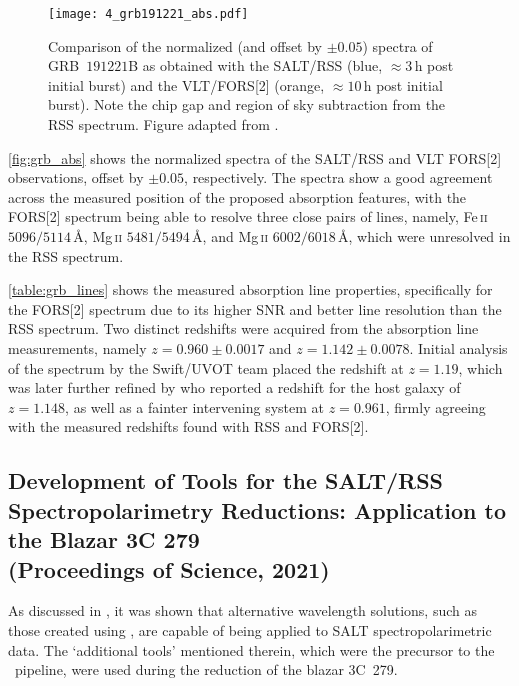 \begin{figure}[t]
    \centering
    \texttt{[image: 4\_grb191221\_abs.pdf]}
    \caption{
        Comparison of the normalized (and offset by $\pm 0.05$) spectra of GRB~$191221$B as obtained with the \gls{SALT}/\gls{RSS} (blue, $\approx 3$\,h post initial burst) and the \gls{VLT}/\gls{FORS}[2] (orange, $\approx 10$\,h post initial burst).
        Note the chip gap and region of sky subtraction from the \gls{RSS} spectrum.
        Figure adapted from \citep{Buckley191221B}.
    }
    \label{fig:grb_abs}
\end{figure}

\autoref{fig:grb_abs} shows the normalized spectra of the \gls{SALT}/\gls{RSS} and \gls{VLT} \gls{FORS}[2] observations, offset by $\pm 0.05$, respectively.
The spectra show a good agreement across the measured position of the proposed absorption features, with the \gls{FORS}[2] spectrum being able to resolve three close pairs of lines, namely, {Fe}\,\textsc{ii} $5096/5114$\,\AA, {Mg}\,\textsc{ii} $5481/5494$\,\AA, and {Mg}\,\textsc{ii} $6002/6018$\,\AA, which were unresolved in the \gls{RSS} spectrum.



\pagebreak

\autoref{table:grb_lines} shows the measured absorption line properties, specifically for the \gls{FORS}[2] spectrum due to its higher \gls{SNR} and better line resolution than the \gls{RSS} spectrum.
Two distinct redshifts were acquired from the absorption line measurements, namely $z = 0.960 \pm 0.0017$ and $z = 1.142 \pm 0.0078$.
Initial analysis of the spectrum by the \gls{Swift}/\gls{UVOT} team \citep{Kuin2019} placed the redshift at $z = 1.19$, which was later further refined by \citet{Vielfaure2019} who reported a redshift for the host galaxy of $z = 1.148$, as well as a fainter intervening system at $z = 0.961$, firmly agreeing with the measured redshifts found with \gls{RSS} and \gls{FORS}[2].

\subsection[Proceeding, HEASA (2021)]{%
    Development of Tools for the \gls{SALT}/\gls{RSS} Spectro\-polari\-metry Reductions: Application to the Blazar 3C 279\\
    (Proceedings of Science,  2021)
}

As discussed in \citet[][see also \autoref{app:papers}]{Cooper_HEASA2021}, it was shown that alternative wavelength solutions, such as those created using \iraf, are capable of being applied to \gls{SALT} spectro\-polarimetric data.
The `additional tools' mentioned therein, which were the precursor to the \stops\ pipeline, were used during the reduction of the blazar 3C~279.

